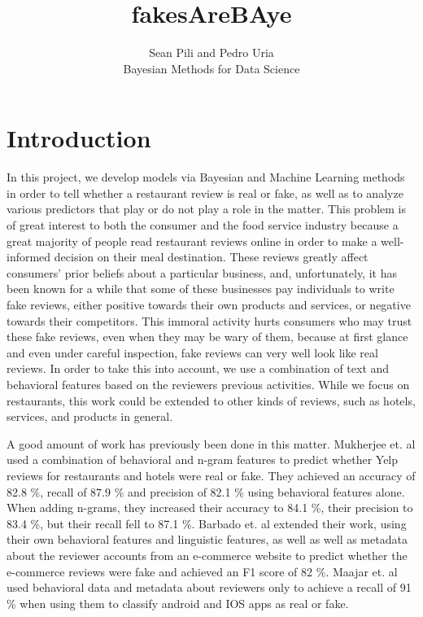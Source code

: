\documentclass[man, floatsintext, 10pt]{apa6}
\title{fakesAreBAye}
\author{Sean Pili and Pedro Uria \\ Bayesian Methods for Data Science}
\affiliation{GWU}
\begin{document}
\maketitle

\section{Introduction}

In this project, we develop models via Bayesian and Machine Learning methods in order to tell whether a restaurant review is real or fake, as well as to analyze various predictors that play or do not play a role in the matter. This problem is of great interest to both the consumer and the food service industry because a great majority of people read restaurant reviews online in order to make a well-informed decision on their meal destination. These reviews greatly affect consumers' prior beliefs about a particular business, and, unfortunately, it has been known for a while that some of these businesses pay individuals to write fake reviews, either positive towards their own products and services, or negative towards their competitors. This immoral activity hurts consumers who may trust these fake reviews, even when they may be wary of them, because at first glance and even under careful inspection, fake reviews can very well look like real reviews. In order to take this into account, we use a combination of text and behavioral features based on the reviewers previous activities.  While we focus on restaurants, this work could be extended to other kinds of reviews, such as hotels, services, and products in general.

A good amount of work has previously been done in this matter. Mukherjee et. al used a combination of behavioral and n-gram features to predict whether Yelp reviews for restaurants and hotels were real or fake. They achieved an accuracy of 82.8 \%, recall of 87.9 \% and precision of 82.1 \% using behavioral features alone. When adding n-grams, they increased their accuracy to 84.1 \%, their precision to 83.4 \%, but their recall fell to 87.1 \%. Barbado et. al  extended their work, using their own behavioral features and linguistic features, as well as well as metadata about the reviewer accounts from an e-commerce website to predict whether the e-commerce reviews were fake and achieved an F1 score of 82 \%. Maajar et. al used behavioral data and metadata about reviewers only to achieve a recall of 91 \% when using them to classify android and IOS apps as real or fake. 
\end{document}
